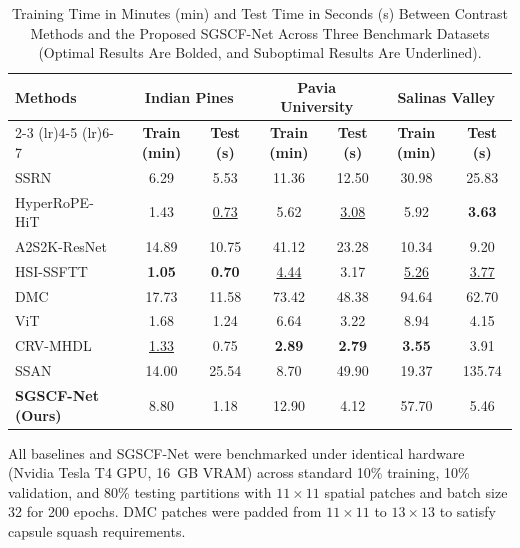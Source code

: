 \documentclass[manuscript,screen,review]{acmart}
\begin{document}
\begin{table}[tbp]
\centering
\footnotesize
\caption{Training Time in Minutes (min) and Test Time in Seconds (s) Between Contrast Methods and the Proposed SGSCF-Net Across Three Benchmark Datasets (Optimal Results Are Bolded, and Suboptimal Results Are Underlined).}
\label{tab:runtime_efficiency_comparison}
\begin{tabular*}{\textwidth}{@{\extracolsep{\fill}}lcccccc}
\toprule
\multirow{2}{*}{\textbf{Methods}} & \multicolumn{2}{c}{\textbf{Indian Pines}} & \multicolumn{2}{c}{\textbf{Pavia University}} & \multicolumn{2}{c}{\textbf{Salinas Valley}} \\
\cmidrule(lr){2-3} \cmidrule(lr){4-5} \cmidrule(lr){6-7}
& \textbf{Train (min)} & \textbf{Test (s)} & \textbf{Train (min)} & \textbf{Test (s)} & \textbf{Train (min)} & \textbf{Test (s)} \\
\midrule
SSRN~\cite{zhong2017spectral}          & 6.29            & 5.53            & 11.36           & 12.50           & 30.98           & 25.83           \\
HyperRoPE-HiT~\cite{khan2025hyperrope} & 1.43            & \underline{0.73}& 5.62            & \underline{3.08}& 5.92            & \textbf{3.63}   \\
A2S2K-ResNet~\cite{roy2020attention}   & 14.89           & 10.75           & 41.12           & 23.28           & 10.34           & 9.20            \\
HSI-SSFTT~\cite{sun2022spectral}       & \textbf{1.05}   & \textbf{0.70}   & \underline{4.44} & 3.17            & \underline{5.26} & \underline{3.77}\\
DMC~\cite{wang2021deep}                & 17.73           & 11.58           & 73.42           & 48.38           & 94.64           & 62.70           \\
ViT~\cite{dosovitskiy2020image}        & 1.68            & 1.24            & 6.64            & 3.22            & 8.94            & 4.15            \\
CRV-MHDL~\cite{alalimi2022compression} & \underline{1.33} & 0.75            & \textbf{2.89}   & \textbf{2.79}   & \textbf{3.55}   & 3.91            \\
SSAN~\cite{sun2019spectral}            & 14.00           & 25.54           & 8.70            & 49.90           & 19.37           & 135.74          \\
\midrule
\textbf{SGSCF-Net (Ours)}              & 8.80            & 1.18            & 12.90           & 4.12            & 57.70           & 5.46            \\
\bottomrule
\end{tabular*}
\flushleft
\scriptsize{All baselines and SGSCF-Net were benchmarked under identical hardware (Nvidia Tesla T4 GPU, 16~GB VRAM) across standard 10\% training, 10\% validation, and 80\% testing partitions with $11 \times 11$ spatial patches and batch size 32 for 200 epochs. DMC patches were padded from $11 \times 11$ to $13 \times 13$ to satisfy capsule squash requirements.}
\end{table}
\end{document}
